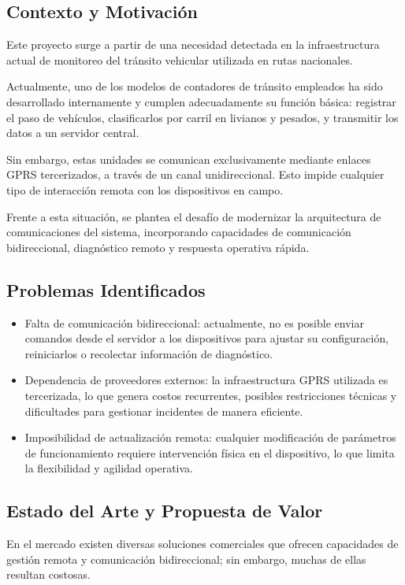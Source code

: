 \documentclass[
11pt, %
]{charter}
\begin{document}
\subsection{Contexto y Motivación}
Este proyecto surge a partir de una necesidad detectada en la infraestructura actual de monitoreo del tránsito vehicular utilizada en rutas nacionales.

Actualmente, uno de los modelos de contadores de tránsito empleados ha sido desarrollado internamente y cumplen adecuadamente su función básica: registrar el paso de vehículos, clasificarlos por carril en livianos y pesados, y transmitir los datos a un servidor central.

Sin embargo, estas unidades se comunican exclusivamente mediante enlaces GPRS tercerizados, a través de un canal unidireccional. Esto impide cualquier tipo de interacción remota con los dispositivos en campo.

Frente a esta situación, se plantea el desafío de modernizar la arquitectura de comunicaciones del sistema, incorporando capacidades de comunicación bidireccional, diagnóstico remoto y respuesta operativa rápida.

\subsection{Problemas Identificados}

\begin{itemize}

\item Falta de comunicación bidireccional: actualmente, no es posible enviar comandos desde el servidor a los dispositivos para ajustar su configuración, reiniciarlos o recolectar información de diagnóstico.

\item Dependencia de proveedores externos: la infraestructura GPRS utilizada es tercerizada, lo que genera costos recurrentes, posibles restricciones técnicas y dificultades para gestionar incidentes de manera eficiente.

\item Imposibilidad de actualización remota: cualquier modificación de parámetros de funcionamiento requiere intervención física en el dispositivo, lo que limita la flexibilidad y agilidad operativa.

\end{itemize}

\subsection{Estado del Arte y Propuesta de Valor}
En el mercado existen diversas soluciones comerciales que ofrecen capacidades de gestión remota y comunicación bidireccional; sin embargo, muchas de ellas resultan costosas.
\end{document}
